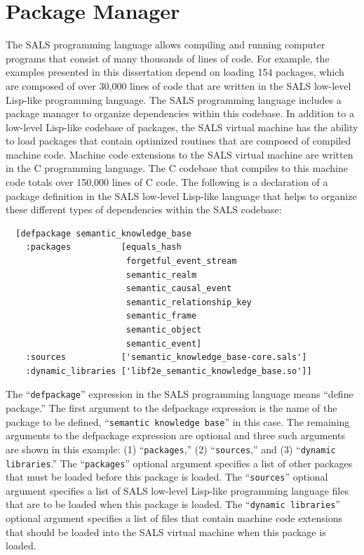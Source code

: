 \section{Package Manager}

The SALS programming language allows compiling and running computer
programs that consist of many thousands of lines of code.  For
example, the examples presented in this dissertation depend on loading
154 packages, which are composed of over 30,000 lines of code that are
written in the SALS low-level Lisp-like programming language.  The
SALS programming language includes a package manager to organize
dependencies within this codebase.  In addition to a low-level
Lisp-like codebase of packages, the SALS virtual machine has the
ability to load packages that contain optimized routines that are
composed of compiled machine code.  Machine code extensions to the
SALS virtual machine are written in the C programming language.  The C
codebase that compiles to this machine code totals over 150,000 lines
of C code.  The following is a declaration of a package definition in
the SALS low-level Lisp-like language that helps to organize these
different types of dependencies within the SALS codebase:
\begin{samepage}
\begin{Verbatim}
  [defpackage semantic_knowledge_base
    :packages          [equals_hash
                        forgetful_event_stream
                        semantic_realm
                        semantic_causal_event
                        semantic_relationship_key
                        semantic_frame
                        semantic_object
                        semantic_event]
    :sources           ['semantic_knowledge_base-core.sals']
    :dynamic_libraries ['libf2e_semantic_knowledge_base.so']]
\end{Verbatim}
\end{samepage}
The ``{\tt{defpackage}}'' expression in the SALS programming language
means ``define package.''  The first argument to the defpackage
expression is the name of the package to be defined, ``{\tt{semantic
    knowledge base}}'' in this case.  The remaining arguments to the
defpackage expression are optional and three such arguments are shown
in this example: (1) ``{\tt{packages}},'' (2) ``{\tt{sources}},'' and
(3) ``{\tt{dynamic libraries}}.''  The ``{\tt{packages}}'' optional
argument specifies a list of other packages that must be loaded before
this package is loaded.  The ``{\tt{sources}}'' optional argument
specifies a list of SALS low-level Lisp-like programming language
files that are to be loaded when this package is loaded.  The
``{\tt{dynamic libraries}}'' optional argument specifies a list of
files that contain machine code extensions that should be loaded into
the SALS virtual machine when this package is loaded.

